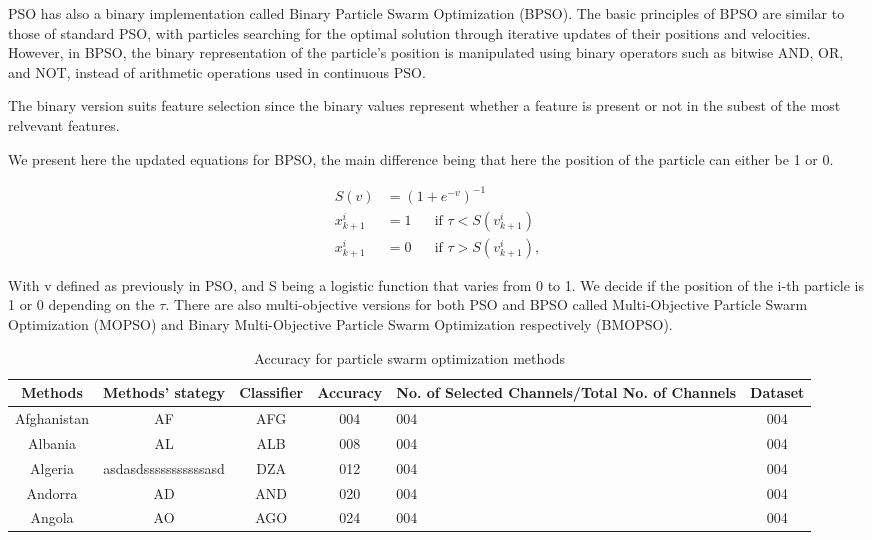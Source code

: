 \documentclass{Configuration_Files/PoliMi3i_thesis}
\begin{document}
PSO has also a binary implementation called Binary Particle Swarm Optimization (BPSO).
The basic principles of BPSO are similar to those of standard PSO, with particles searching for the optimal solution through iterative updates of their positions and velocities. However, in BPSO, the binary representation of the particle's position is manipulated using binary operators such as bitwise AND, OR, and NOT, instead of arithmetic operations used in continuous PSO. \cite{kennedyDiscreteBinaryVersion1997}

The binary version suits feature selection since the binary values represent whether a feature is present or not in the subest of the most relvevant features.

We present here the updated equations for BPSO, the main difference being that here the position of the particle can either be 1 or 0. \cite{abdullahEEGChannelSelection2022}


\begin{align}
S(v) &= \left(1+e^{-v}\right)^{-1} \\
x_{k+1}^i &=1 \:\:\:\:\:\: \text { if } \tau<S\left(v_{k+1}^i\right) \\
x_{k+1}^i &=0 \:\:\:\:\:\: \text { if } \tau>S\left(v_{k+1}^i\right),
\end{align}

With v defined as previously in PSO, and S being a logistic function that varies from 0 to 1.
We decide if the position of the i-th particle is 1 or 0 depending on the $\tau$.
There are also multi-objective versions for both PSO and BPSO called Multi-Objective Particle Swarm Optimization (MOPSO) and Binary Multi-Objective Particle Swarm Optimization respectively (BMOPSO). \cite{coellocoelloMOPSOProposalMultiple2002}

\begin{table}[H]
\caption{Accuracy for particle swarm optimization methods}
\begin{tabular}{|c|c|c|c|p{2cm}|c|}
\hline
Methods & Methods' stategy & Classifier &Accuracy&No. of Selected Channels/Total No. of Channels&Dataset\\
\hline
Afghanistan   & AF    &AFG&   004&   004&   004\\
Albania &AL & ALB&  008&   004&   004\\
Algeria    &asdasdsssssssssssasd & DZA&  012&   004&   004\\
Andorra& AD  & AND   &020&   004&   004\\
Angola& AO  & AGO&024&   004&   004\\
\hline
\end{tabular}
\end{table}
\end{document}
